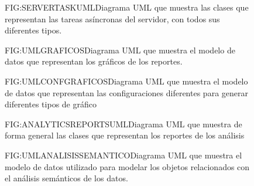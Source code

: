 \begin{figure}[Diagrama UML Tareas Asíncronas]{FIG:SERVERTASKUML}{Diagrama UML que muestra las clases que representan las tareas asíncronas del servidor, con todos sus diferentes tipos.}
\end{figure}

\begin{figure}[Diagrama UML Reportes gráficos]{FIG:UMLGRAFICOS}{Diagrama UML que muestra el modelo de datos que representan los gráficos de los reportes.}
\end{figure}

\begin{figure}[Diagrama UML Preferencias Gráficos]{FIG:UMLCONFGRAFICOS}{Diagrama UML que muestra el modelo de datos que representan las configuraciones diferentes para generar diferentes tipos de gráfico}
\end{figure}
\begin{figure}[Diagrama UML Reportes Análisis]{FIG:ANALYTICSREPORTSUML}{Diagrama UML que muestra de forma general las clases que representan los reportes de los análisis}
\end{figure}
\begin{figure}[Diagrama UML Análisis Semántico]{FIG:UMLANALISISSEMANTICO}{Diagrama UML que muestra el modelo de datos utilizado para modelar los objetos relacionados con el análisis semánticos de los datos.}
\end{figure}